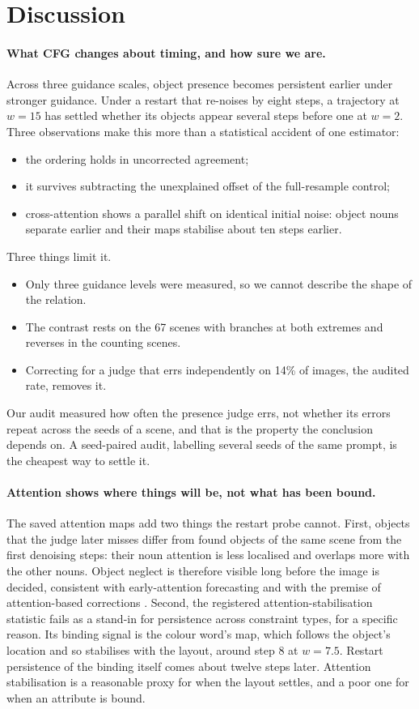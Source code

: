 \section{Discussion}\label{sec:discussion}
\paragraph{What CFG changes about timing, and how sure we are.} Across three guidance scales, object presence becomes persistent earlier under stronger guidance. Under a restart that re-noises by eight steps, a trajectory at $w=15$ has settled whether its objects appear several steps before one at $w=2$. Three observations make this more than a statistical accident of one estimator:
\begin{itemize}
\item the ordering holds in uncorrected agreement;
\item it survives subtracting the unexplained offset of the full-resample control;
\item cross-attention shows a parallel shift on identical initial noise: object nouns separate earlier and their maps stabilise about ten steps earlier.
\end{itemize}
Three things limit it.
\begin{itemize}
\item Only three guidance levels were measured, so we cannot describe the shape of the relation.
\item The contrast rests on the 67 scenes with branches at both extremes and reverses in the counting scenes.
\item Correcting for a judge that errs independently on 14\% of images, the audited rate, removes it.
\end{itemize}
Our audit measured how often the presence judge errs, not whether its errors repeat across the seeds of a scene, and that is the property the conclusion depends on. A seed-paired audit, labelling several seeds of the same prompt, is the cheapest way to settle it.

\paragraph{Attention shows where things will be, not what has been bound.} The saved attention maps add two things the restart probe cannot. First, objects that the judge later misses differ from found objects of the same scene from the first denoising steps: their noun attention is less localised and overlaps more with the other nouns. Object neglect is therefore visible long before the image is decided, consistent with early-attention forecasting \citep{diffusionprobe2026,guo2024initno} and with the premise of attention-based corrections \citep{chefer2023attend}. Second, the registered attention-stabilisation statistic fails as a stand-in for persistence across constraint types, for a specific reason. Its binding signal is the colour word's map, which follows the object's location and so stabilises with the layout, around step 8 at $w=7.5$. Restart persistence of the binding itself comes about twelve steps later. Attention stabilisation is a reasonable proxy for when the layout settles, and a poor one for when an attribute is bound.

